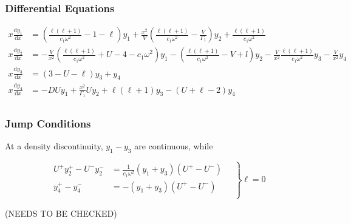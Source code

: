 \documentclass[fleqn]{article}
\newcommand{\diff}{\ensuremath{\mathrm{d}}}
\newcommand{\Vg}{\ensuremath{\frac{V}{\Gamma_{1}}}}
\begin{document}
\subsubsection*{Differential Equations}

\begin{align*}
x \frac{\diff y_{1}}{\diff x} &=
\left(\frac{\ell(\ell+1)}{c_{1} \omega^{2}} - 1 - \ell \right) y_{1} +
\frac{x^{2}}{V} \left(\frac{\ell(\ell+1)}{c_{1} \omega^{2}} - \Vg \right) y_{2} +
\frac{\ell(\ell+1)}{c_{1} \omega^{2}} \\
x \frac{\diff y_{2}}{\diff x} &=
-\frac{V}{x^{2}} \left( \frac{\ell(\ell+1)}{c_{1} \omega^{2}} + U - 4 - c_{1} \omega^{2} \right) y_{1} -
\left(\frac{\ell(\ell+1)}{c_{1} \omega^{2}} - V + l\right) y_{2} -
\frac{V}{x^{2}} \frac{\ell(\ell+1)}{c_{1} \omega^{2}} y_{3} -
\frac{V}{x^{2}} y_{4} \\
x \frac{\diff y_{3}}{\diff x} &=
(3 - U - \ell) y_{3} +
y_{4} \\
x \frac{\diff y_{4}}{\diff x} &=
- D U y_{1} +
\frac{x^{2}}{\Gamma_{1}} U y_{2} +
\ell(\ell+1) y_{3} -
(U + \ell - 2) y_{4} \\
\end{align*}

\subsubsection*{Jump Conditions}

At a density discontinuity, $y_{1}-y_{3}$ are continuous, while

\begin{equation*}
\left.
\begin{aligned}
U^{+} y_{2}^{+} - U^{-} y_{2}^{-} &= \frac{1}{c_{1}\omega^{2}}(y_{1} + y_{3}) (U^{+} - U^{-}) \\
y_{4}^{+} - y_{4}^{-} &= -(y_{1}+y_{3}) (U^{+} - U^{-}) \\
\end{aligned}
\quad \right\} \ell = 0
\end{equation*}

(NEEDS TO BE CHECKED)


\end{document}
